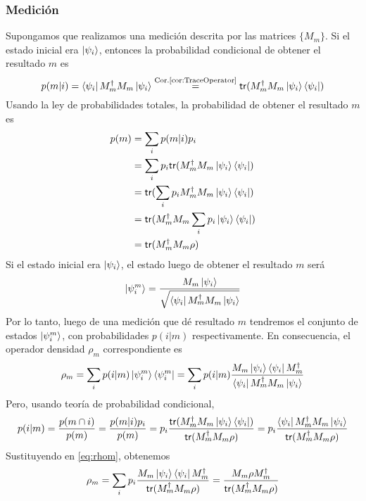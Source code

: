 \subsubsection{Medición}
Supongamos que realizamos una medición descrita por las matrices $\{M_m\}$. Si el
estado inicial era $\ket{\psi_i}$, entonces la probabilidad condicional de obtener el
resultado $m$ es
\[
  p(m|i) = \bra{\psi_i}M_m^\dagger
  M_m\ket{\psi_i}\stackrel{\textrm{Cor.\ref{cor:TraceOperator}}}{=}\mathsf{tr}(M_m^\dagger
  M_m\ket{\psi_i}\bra{\psi_i})
\]
Usando la ley de probabilidades totales, la probabilidad de obtener el resultado
$m$ es
\begin{align*}
  p(m) &= \sum_i p(m|i)p_i \\
       &=\sum_i p_i\mathsf{tr}(M_m^\dagger M_m\ket{\psi_i}\bra{\psi_i})\\
       &=\mathsf{tr}(\sum_i p_iM_m^\dagger M_m\ket{\psi_i}\bra{\psi_i})\\
       &=\mathsf{tr}(M_m^\dagger M_m\sum_i p_i\ket{\psi_i}\bra{\psi_i})\\
       &=\mathsf{tr}(M_m^\dagger M_m\rho)
\end{align*}
Si el estado inicial era $\ket{\psi_i}$, el estado luego de obtener el resultado
$m$ será
\[
  \ket{\psi_i^m} = \frac{M_m\ket{\psi_i}}{\sqrt{\bra{\psi_i}M_m^\dagger
      M_m\ket{\psi_i}}}
\]
Por lo tanto, luego de una medición que dé resultado $m$ tendremos el conjunto
de estados $\ket{\psi_i^m}$, con probabilidades $p(i|m)$ respectivamente. En consecuencia, el operador densidad $\rho_m$ correspondiente es
\begin{equation}
  \label{eq:rhom}
  \rho_m = \sum_i p(i|m)\ket{\psi_i^m}\bra{\psi_i^m} = \sum_i p(i|m)\frac{M_m\ket{\psi_i}\bra{\psi_i}M_m^\dagger}{\bra{\psi_i}M_m^\dagger M_m\ket{\psi_i}}
\end{equation}
Pero, usando teoría de probabilidad condicional,
\[
  p(i|m) = \frac{p(m\cap i)}{p(m)}=\frac{p(m|i)p_i}{p(m)} =
  p_i\frac{\mathsf{tr}(M_m^\dagger M_m\ket{\psi_i}\bra{\psi_i})}{\mathsf{tr}(M_m^\dagger
    M_m\rho)} =p_i\frac{\bra{\psi_i}M_m^\dagger M_m\ket{\psi_i}}{\mathsf{tr}(M_m^\dagger
    M_m\rho)}
\]
Sustituyendo en \eqref{eq:rhom}, obtenemos
\[
  \rho_m = \sum_i
  p_i\frac{M_m\ket{\psi_i}\bra{\psi_i}M_m^\dagger}{\mathsf{tr}(M_m^\dagger M_m\rho)} =
  \frac{M_m\rho M_m^\dagger}{\mathsf{tr}(M_m^\dagger M_m\rho)}
\]

